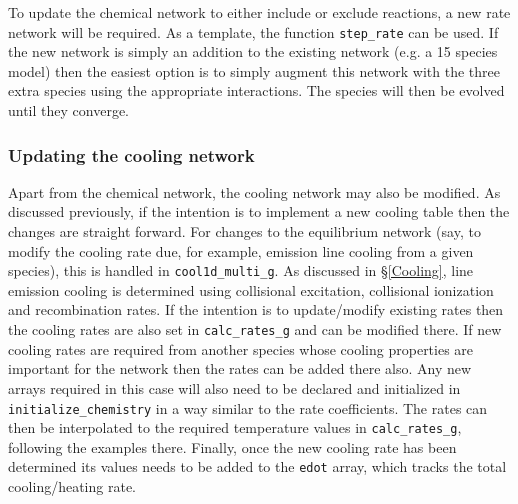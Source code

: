 To update the chemical network to either include or exclude reactions,
a new rate network will be required. As a template, the function
\texttt{step\_rate} can be used.  If the new network is simply an
addition to the existing network (e.g. a 15 species model) then the
easiest option is to simply augment this network with the three extra
species using the appropriate interactions. The species will then be
evolved until they converge.

\subsubsection{Updating the cooling network}

Apart from the chemical network, the cooling network may also be
modified. As discussed previously, if the intention is to implement a
new cooling table then the changes are straight forward.  For changes
to the equilibrium network (say, to modify the cooling rate due, for
example, emission line cooling from a given species), this is handled
in \texttt{cool1d\_multi\_g}. As discussed in \S \ref{Cooling}, line
emission cooling is determined using collisional excitation,
collisional ionization and recombination rates. If the intention is to
update/modify existing rates then the cooling rates are also set in
\texttt{calc\_rates\_g} and can be modified there. If new cooling
rates are required from another species whose cooling properties are
important for the network then the rates can be added there also. Any
new arrays required in this case will also need to be declared and
initialized in \texttt{initialize\_chemistry} in a way similar to the
rate coefficients. The rates can then be interpolated to the required
temperature values in \texttt{calc\_rates\_g}, following the examples
there. Finally, once the new cooling rate has been determined its
values needs to be added to the \texttt{edot} array, which tracks
the total cooling/heating rate.


